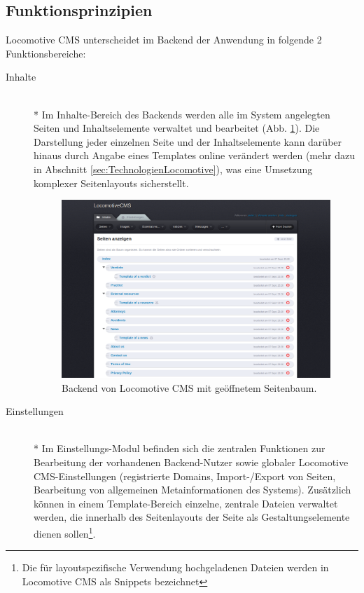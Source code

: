 \subsection{Funktionsprinzipien}
Locomotive CMS unterscheidet im Backend der Anwendung in folgende 2 Funktionsbereiche:
\begin{description}
\item[Inhalte]\mbox{~}\\*
Im Inhalte-Bereich des Backends werden alle im System angelegten Seiten und Inhaltselemente verwaltet und bearbeitet (Abb. \ref{locomotivebackend}). Die Darstellung jeder einzelnen Seite und der Inhaltselemente kann darüber hinaus durch Angabe eines Templates online verändert werden (mehr dazu in Abschnitt \ref{sec:TechnologienLocomotive}), was eine Umsetzung komplexer Seitenlayouts sicherstellt.
\begin{figure}[!h]
\begin{center}
\includegraphics[scale=0.3]{images/analyse/locomotive/backendlocomotive.png}
\caption{Backend von Locomotive CMS mit geöffnetem Seitenbaum.}
\label{locomotivebackend}
\end{center}
\end{figure}
\item[Einstellungen]\mbox{~}\\*
Im Einstellungs-Modul befinden sich die zentralen Funktionen zur Bearbeitung der vorhandenen Backend-Nutzer sowie globaler Locomotive CMS-Einstellungen (registrierte Domains, Import-/Export von Seiten, Bearbeitung von allgemeinen Metainformationen des Systems). Zusätzlich können in einem Template-Bereich einzelne, zentrale Dateien verwaltet werden, die innerhalb des Seitenlayouts der Seite als Gestaltungselemente dienen sollen\footnote{Die für layoutspezifische Verwendung hochgeladenen Dateien werden in Locomotive CMS als Snippets bezeichnet}.
\end{description}
